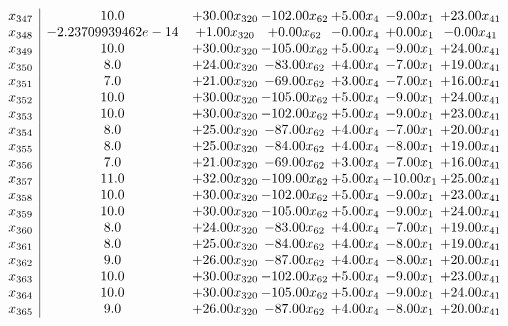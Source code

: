 \documentclass[8pt]{article}
\begin{document}
\[\begin{array}{c| c c@{\hskip 2pt} c@{\hskip 2pt} c@{\hskip 2pt} c@{\hskip 2pt} c@{\hskip 2pt} }
 x_{347}   &  10.0 & + 30.00 x_{320} & -102.00 x_{62} & +  5.00 x_{4} & -9.00 x_{1} & + 23.00 x_{41}\\
 x_{348}   &  -2.23709939462e-14 & +  1.00 x_{320} & +  0.00 x_{62} & -0.00 x_{4} & +  0.00 x_{1} & -0.00 x_{41}\\
 x_{349}   &  10.0 & + 30.00 x_{320} & -105.00 x_{62} & +  5.00 x_{4} & -9.00 x_{1} & + 24.00 x_{41}\\
 x_{350}   &  8.0 & + 24.00 x_{320} & -83.00 x_{62} & +  4.00 x_{4} & -7.00 x_{1} & + 19.00 x_{41}\\
 x_{351}   &  7.0 & + 21.00 x_{320} & -69.00 x_{62} & +  3.00 x_{4} & -7.00 x_{1} & + 16.00 x_{41}\\
 x_{352}   &  10.0 & + 30.00 x_{320} & -105.00 x_{62} & +  5.00 x_{4} & -9.00 x_{1} & + 24.00 x_{41}\\
 x_{353}   &  10.0 & + 30.00 x_{320} & -102.00 x_{62} & +  5.00 x_{4} & -9.00 x_{1} & + 23.00 x_{41}\\
 x_{354}   &  8.0 & + 25.00 x_{320} & -87.00 x_{62} & +  4.00 x_{4} & -7.00 x_{1} & + 20.00 x_{41}\\
 x_{355}   &  8.0 & + 25.00 x_{320} & -84.00 x_{62} & +  4.00 x_{4} & -8.00 x_{1} & + 19.00 x_{41}\\
 x_{356}   &  7.0 & + 21.00 x_{320} & -69.00 x_{62} & +  3.00 x_{4} & -7.00 x_{1} & + 16.00 x_{41}\\
 x_{357}   &  11.0 & + 32.00 x_{320} & -109.00 x_{62} & +  5.00 x_{4} & -10.00 x_{1} & + 25.00 x_{41}\\
 x_{358}   &  10.0 & + 30.00 x_{320} & -102.00 x_{62} & +  5.00 x_{4} & -9.00 x_{1} & + 23.00 x_{41}\\
 x_{359}   &  10.0 & + 30.00 x_{320} & -105.00 x_{62} & +  5.00 x_{4} & -9.00 x_{1} & + 24.00 x_{41}\\
 x_{360}   &  8.0 & + 24.00 x_{320} & -83.00 x_{62} & +  4.00 x_{4} & -7.00 x_{1} & + 19.00 x_{41}\\
 x_{361}   &  8.0 & + 25.00 x_{320} & -84.00 x_{62} & +  4.00 x_{4} & -8.00 x_{1} & + 19.00 x_{41}\\
 x_{362}   &  9.0 & + 26.00 x_{320} & -87.00 x_{62} & +  4.00 x_{4} & -8.00 x_{1} & + 20.00 x_{41}\\
 x_{363}   &  10.0 & + 30.00 x_{320} & -102.00 x_{62} & +  5.00 x_{4} & -9.00 x_{1} & + 23.00 x_{41}\\
 x_{364}   &  10.0 & + 30.00 x_{320} & -105.00 x_{62} & +  5.00 x_{4} & -9.00 x_{1} & + 24.00 x_{41}\\
 x_{365}   &  9.0 & + 26.00 x_{320} & -87.00 x_{62} & +  4.00 x_{4} & -8.00 x_{1} & + 20.00 x_{41}\\

\end{array}\]
\end{document}
